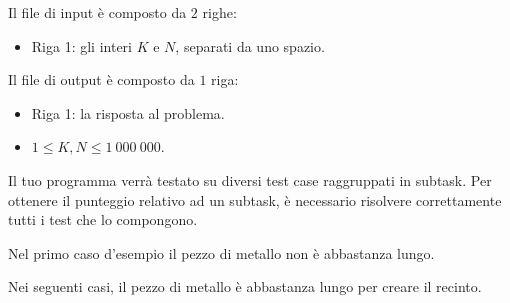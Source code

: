 Il file di input è composto da $2$ righe:
\begin{itemize}
    \item Riga 1: gli interi $K$ e $N$, separati da uno spazio.
\end{itemize}

Il file di output è composto da $1$ riga:
\begin{itemize}
    \item Riga 1: la risposta al problema.
\end{itemize}


\Constraints

\begin{itemize}[nolistsep, itemsep=2mm]
    \item $1 \le K, N \le 1\:000\:000$.
\end{itemize}


\Scoring

Il tuo programma verrà testato su diversi test case raggruppati in subtask.
Per ottenere il punteggio relativo ad un subtask,
è necessario risolvere correttamente tutti i test che lo compongono.






\Examples

\begin{example}
\end{example}


\Explanation

Nel primo caso d'esempio il pezzo di metallo non è abbastanza lungo.

Nei seguenti casi, il pezzo di metallo è abbastanza lungo per creare il recinto.